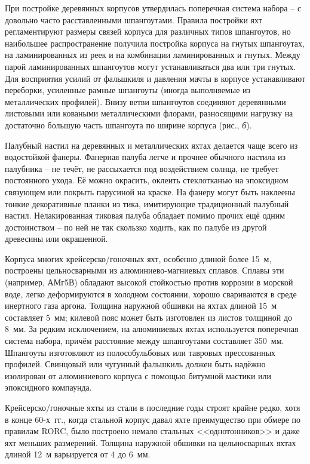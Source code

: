 При постройке деревянных корпусов утвердилась поперечная система набора \--- с довольно часто расставленными шпангоутами. Правила постройки яхт регламентируют размеры связей корпуса для различных типов шпангоутов, но наибольшее распространение получила постройка корпуса на гнутых шпангоутах, на ламинированных из реек и на комбинации ламинированных и гнутых. Между парой ламинированных шпангоутов могут устанавливаться два или три гнутых. Для восприятия усилий от фальшкиля и давления мачты в корпусе устанавливают переборки, усиленные рамные шпангоуты (иногда выполняемые из металлических профилей). Внизу ветви шпангоутов соединяют деревянными листовыми или коваными металлическими флорами, разносящими нагрузку на достаточно большую часть шпангоута по ширине корпуса (рис., \textit{б}).

Палубный настил на деревянных и металлических яхтах делается чаще всего из водостойкой фанеры. Фанерная палуба легче и прочнее обычного настила из палубника \--- не течёт, не рассыхается под воздействием солнца, не требует постоянного ухода. Её можно окрасить, оклеить стеклотканью на эпоксидном связующем или покрыть парусиной на краске. На фанеру могут быть наклеены тонкие декоративные планки из тика, имитирующие традиционный палубный настил. Нелакированная тиковая палуба обладает помимо прочих ещё одним достоинством \--- по ней не так скользко ходить, как по палубе из другой древесины или окрашенной.
 
Корпуса многих крейсерско\-/гоночных яхт, особенно длиной более 15~м, построены цельносварными из алюминиево-магниевых сплавов. Сплавы эти (например, АМг5В) обладают высокой стойкостью против коррозии в морской воде, легко деформируются в холодном состоянии, хорошо свариваются в среде инертного газа аргона. Толщина наружной обшивки на яхтах длиной 15~м составляет 5~мм; килевой пояс может быть изготовлен из листов толщиной до 8~мм. За редким исключением, на алюминиевых яхтах используется поперечная система набора, причём расстояние между шпангоутами составляет 350~мм. Шпангоуты изготовляют из полособульбовых или тавровых прессованных профилей. Свинцовый или чугунный фальшкиль должен быть надёжно изолирован от алюминиевого корпуса с помощью битумной мастики или эпоксидного компаунда.

Крейсерско\-/гоночные яхты из стали в последние годы строят крайне редко, хотя в конце 60-х~гг., когда стальной корпус давал яхте преимущество при обмере по правилам RORC, было построено немало стальных <<однотонников>> и даже яхт меньших размерений. Толщина наружной обшивки на цельносварных яхтах длиной 12~м варьируется от 4 до 6~мм.

